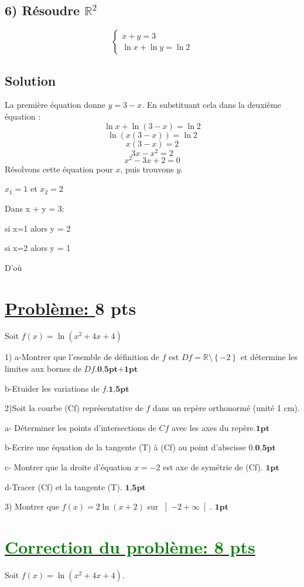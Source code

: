 \documentclass[12pt]{article}
\begin{document}
\subsection*{6) Résoudre $\mathbb{R}^{2}$ } 
\[
\begin{cases}
x + y = 3 \\
\ln x + \ln y = \ln 2
\end{cases}
\]

\subsection*{Solution}
La première équation donne \( y = 3 - x \). En substituant cela dans la deuxième équation :
\[
\ln x + \ln (3 - x) = \ln 2
\]
\[
\ln (x(3 - x)) = \ln 2
\]
\[
x(3 - x) = 2
\]
\[
3x - x^2 = 2
\]
\[
x^2 - 3x + 2 = 0
\]
Résolvons cette équation pour \(x\), puis trouvons \(y\).

$x_{1}=1$ et $x_{2}=2$

Dans x + y = 3:

si x=1 alors y = 2 

si x=2 alors y = 1 

D'où \textcolor{green}{}
\section*{\underline{Problème: }\textbf{8 pts}}
Soit $f(x)=\ln(x^{2}+4x+4)$

1) a-Montrer que l'esemble de définition de $f$ est $Df=\mathbb{R}\setminus\left\lbrace -2 \right\rbrace $ et détermine les limites aux bornes de $Df$.$\textbf{0,5pt+1pt}$

b-Etuider les variations de $f$.$\textbf{1,5pt}$

2)Soit la courbe (Cf) représentative de $f$ dans un repère orthonormé (unité 1 cm).

a- Déterminer les points d'intersections de $Cf$ avec les axes du repère.$\textbf{1pt}$

b-Ecrire une équation de la tangente (T) à (Cf) au point d'abscisse 0.$\textbf{0,5pt}$

c- Montrer que la droite d'équation $x=-2$ est axe de  symétrie de (Cf). $\textbf{1pt}$

d-Tracer (Cf) et la tangente (T). $\textbf{1,5pt}$

3) Montrer que $f(x)=2\ln(x+2)$ sur $ \left]-2 +\infty \right[ $. $\textbf{1pt}$

\section*{\underline{\textcolor{green}{Correction du problème: \textbf{8 pts}}}}
Soit \( f(x) = \ln(x^2 + 4x + 4) \).
\end{document}
